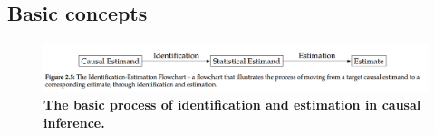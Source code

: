 \documentclass[11pt]{article}
\begin{document}
\subsection{Basic concepts}
\begin{figure}
\begin{minipage}[t]{1\linewidth}
  \centering
  \centerline{\includegraphics[scale = 0.35]{idt_est.png}}
\end{minipage}
\caption{\footnotesize{\textbf{The basic process of identification and estimation in causal inference.  \citep{neal2020introduction}}}}
\label{fig: idt_est}
\end{figure}
\end{document}

